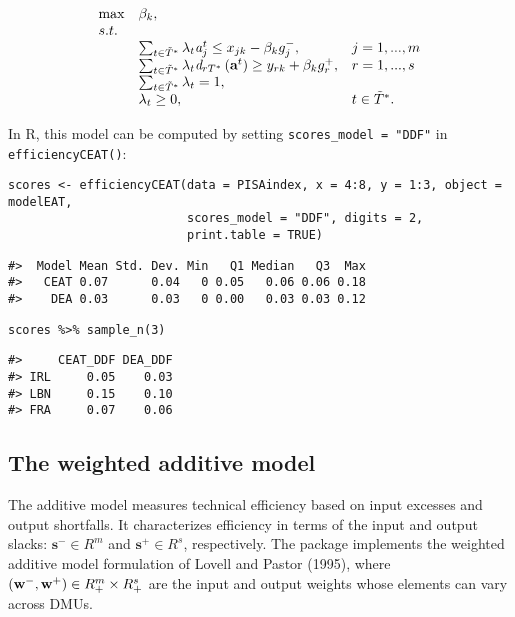 \begin{equation} \label{(30)} 
\begin{array}{lllll} 
{} & {\max } & {\beta _{k}, } & {} & {} \\ 
{} & {s.t.} & {} & {} & {} \\ 
{} & {} & {\sum_{t\in \tilde{T}^{*} }^{}\lambda_{t} {\it a}_{j}^{t} \le x_{jk} -\beta_{k} g_{j}^{-} ,} & {j=1,...,m} & {} \\ 
{} & {} & {\sum_{t\in \tilde{T}^{*} }^{}\lambda_{t} {\it d}_{rT^{*}} \left({\it \textbf{a}}^{t} \right) \ge y_{rk} +\beta_{k} g_{r}^{+} ,} & {r=1,...,s} & {} \\ 
{} & {} & {\sum_{t\in \tilde{T}^{*} }^{}\lambda_{t}=1,} & {} & {} \\ 
{} & {} & {\lambda _{t} \ge 0,} & {t\in \tilde{T}^{*}. } & {} 
\end{array} 
\end{equation}

In R, this model can be computed by setting \texttt{scores\_model\ =\ "DDF"} in \texttt{efficiencyCEAT()}:

\begin{verbatim}
scores <- efficiencyCEAT(data = PISAindex, x = 4:8, y = 1:3, object = modelEAT, 
                         scores_model = "DDF", digits = 2, 
                         print.table = TRUE)
\end{verbatim}

\begin{verbatim}
#>  Model Mean Std. Dev. Min   Q1 Median   Q3  Max
#>   CEAT 0.07      0.04   0 0.05   0.06 0.06 0.18
#>    DEA 0.03      0.03   0 0.00   0.03 0.03 0.12
\end{verbatim}

\begin{verbatim}
scores %>% sample_n(3)
\end{verbatim}

\begin{verbatim}
#>     CEAT_DDF DEA_DDF
#> IRL     0.05    0.03
#> LBN     0.15    0.10
#> FRA     0.07    0.06
\end{verbatim}

\hypertarget{the-weighted-additive-model}{%
\subsection{The weighted additive model}\label{the-weighted-additive-model}}

The additive model measures technical efficiency based on input excesses and output shortfalls. It characterizes efficiency in terms of the input and output slacks: \(\textbf{s}^{-} \in R^{m}\) and \(\textbf{s}^{+} \in R^{s}\), respectively. The  package implements the weighted additive model formulation of Lovell and Pastor (1995), where \(({\it \textbf{w}}^{-} ,{\it \textbf{w}}^{+})\in R_{+}^{m} \times R_{+}^{s}\) are the input and output weights whose elements can vary across DMUs.

